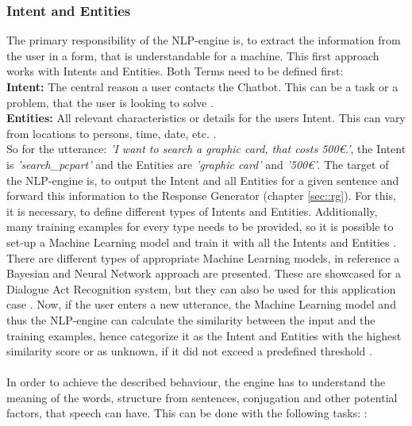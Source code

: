 \documentclass[10pt,final,journal,a4paper,oneside,twocolumn]{IEEEtran}
\begin{document}
\subsubsection{Intent and Entities}\label{sec:inform}
The primary responsibility of the NLP-engine is, to extract the information from the user in a form, that is understandable for a machine. This first approach works with Intents and Entities. Both Terms need to be defined first:\\
\textbf{Intent:} The central reason a user contacts the Chatbot. This can be a task or a problem, that the user is looking to solve \cite{b10}.\\
\textbf{Entities:} All relevant characteristics or details for the users Intent. This can vary from locations to persons, time, date, etc. \cite{b10}.\\
So for the utterance: \textit{'I want to search a graphic card, that costs 500\euro.'}, the Intent is \textit{'search\_pcpart'} and the Entities are \textit{'graphic card'} and \textit{'500\euro'}. The target of the NLP-engine is, to output the Intent and all Entities for a given sentence and forward this information to the Response Generator (chapter \ref{sec::rg}). For this, it is necessary, to define different types of Intents and Entities. Additionally, many training examples for every type needs to be provided, so it is possible to set-up a Machine Learning model and train it with all the Intents and Entities \cite{b10}. There are different types of appropriate Machine Learning models, in reference \cite[p. 8-19]{b12} a Bayesian and Neural Network approach are presented. These are showcased for a Dialogue Act Recognition system, but they can also be used for this application case \cite{b6}. Now, if the user enters a new utterance, the Machine Learning model and thus the NLP-engine can calculate the similarity between the input and the training examples, hence categorize it as the Intent and Entities with the highest similarity score or as unknown, if it did not exceed a predefined threshold \cite{b10}.\\
\\
In order to achieve the described behaviour, the engine has to understand the meaning of the words, structure from sentences, conjugation and other potential factors, that speech can have. This can be done with the following tasks: \cite{b11}:
\end{document}
